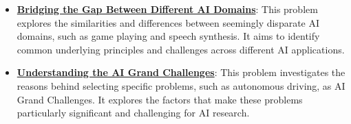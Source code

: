 \documentclass{article}%
\begin{document}
\begin{itemize}[leftmargin=*]
\item \href{https://purdue.brightspace.com/d2l/common/assets/pdfjs-d2l-dist/1.0.14-legacy/web/viewer.html?file=\%2Fcontent\%2Fenforced\%2F1095467-wl.202510.CS.24300.001\%2F02L2-Intro.pdf\%3Fou\%3D1095467\&lang=en-us\&container=d2l-fileviewer-rendered-pdf\&fullscreen=d2l-fileviewer-rendered-pdf-dialog\&height=667#page=31}{\textbf{Bridging the Gap Between Different AI Domains}}: This problem explores the similarities and differences between seemingly disparate AI domains, such as game playing and speech synthesis. It aims to identify common underlying principles and challenges across different AI applications.%
\item \href{https://purdue.brightspace.com/d2l/common/assets/pdfjs-d2l-dist/1.0.14-legacy/web/viewer.html?file=\%2Fcontent\%2Fenforced\%2F1095467-wl.202510.CS.24300.001\%2F02L2-Intro.pdf\%3Fou\%3D1095467\&lang=en-us\&container=d2l-fileviewer-rendered-pdf\&fullscreen=d2l-fileviewer-rendered-pdf-dialog\&height=667#page=43}{\textbf{Understanding the AI Grand Challenges}}: This problem investigates the reasons behind selecting specific problems, such as autonomous driving, as AI Grand Challenges. It explores the factors that make these problems particularly significant and challenging for AI research.%
\end{itemize}

%
\end{document}

